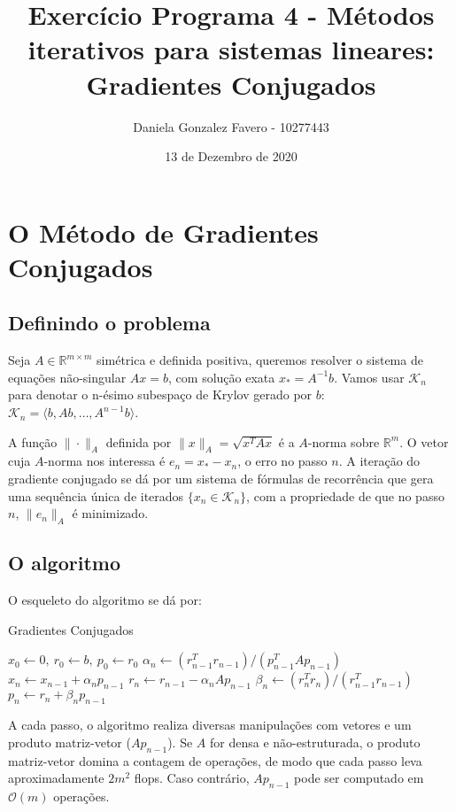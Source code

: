 \documentclass[a4paper,11pt]{article}
\title{Exercício Programa 4 - Métodos iterativos para sistemas lineares: Gradientes Conjugados}
\author{
  Daniela Gonzalez Favero - 10277443
}
\date{13 de Dezembro de 2020}
\begin{document}
    \maketitle
    
    \section{O Método de Gradientes Conjugados}
    \subsection{Definindo o problema}
        Seja $A \in \mathbb{R}^{m \times m}$ simétrica e definida positiva, queremos resolver o sistema de equações não-singular $Ax=b$, com solução exata $x_* = A^{-1}b$. Vamos usar $\mathcal{K}_n$ para denotar o n-ésimo subespaço de Krylov gerado por $b$: $\mathcal{K}_n = \langle b,Ab, \dots , A^{n-1}b \rangle$.
        
        A função $\| \cdot \|_A$ definida por $\| x \|_A = \sqrt{x^TAx}$ é a $A$-norma sobre $\mathbb{R}^{m}$. O vetor cuja $A$-norma nos interessa é $e_n=x_*-x_n$, o erro no passo $n$. A iteração do gradiente conjugado se dá por um sistema de fórmulas de recorrência que gera uma sequência única de iterados $\{ x_n \in \mathcal{K}_n \}$, com a propriedade de que no passo $n$, $\| e_n \|_A$ é minimizado.
    \subsection{O algoritmo}
        O esqueleto do algoritmo se dá por:
        \begin{algorithm}
            \renewcommand\thealgorithm{}
            \caption{Gradientes Conjugados}
            \begin{algorithmic} 
                \STATE $x_0 \leftarrow 0,\ r_0 \leftarrow b,\ p_0 \leftarrow r_0$
                    \STATE $\alpha_n \leftarrow (r^T_{n-1}r_{n-1})/(p^T_{n-1}Ap_{n-1})$
                    \STATE $x_n \leftarrow x_{n-1} + \alpha_np_{n-1}$
                    \STATE $r_n \leftarrow r_{n-1} - \alpha_nAp_{n-1}$
                    \STATE $\beta_n \leftarrow (r^T_nr_n)/(r^T_{n-1}r_{n-1})$
                    \STATE $p_n \leftarrow r_n + \beta_np_{n-1}$
                \ENDFOR
            \end{algorithmic}
        \end{algorithm}
        
        A cada passo, o algoritmo realiza diversas manipulações com vetores e um produto matriz-vetor ($Ap_{n-1}$). Se $A$ for densa e não-estruturada, o produto matriz-vetor domina a contagem de operações, de modo que cada passo leva aproximadamente $2m^2$ flops. Caso contrário, $Ap_{n-1}$ pode ser computado em $\mathcal{O}(m)$ operações.
    
\end{document}
